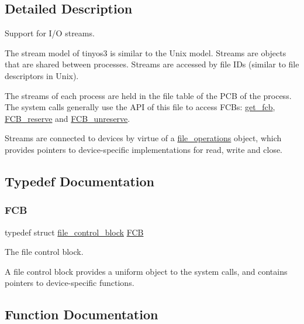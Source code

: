 \subsection{Detailed Description}
Support for I/O streams. 

The stream model of tinyos3 is similar to the Unix model. Streams are objects that are shared between processes. Streams are accessed by file I\+Ds (similar to file descriptors in Unix).

The streams of each process are held in the file table of the P\+CB of the process. The system calls generally use the A\+PI of this file to access F\+C\+Bs\+: \hyperlink{group__streams_ga36b4f172aba29ba2660d0aed0f10d60b}{get\+\_\+fcb}, \hyperlink{group__streams_ga462269376de145171b87b7bc3036e4f8}{F\+C\+B\+\_\+reserve} and \hyperlink{group__streams_gac44c094845a8d4e2e13f9df5b17274df}{F\+C\+B\+\_\+unreserve}.

Streams are connected to devices by virtue of a {\ttfamily \hyperlink{structfile__operations}{file\+\_\+operations}} object, which provides pointers to device-\/specific implementations for read, write and close. 

\subsection{Typedef Documentation}
\mbox{\label{group__streams_ga0c7e751afb9d6cadebf070961804d400}} 
\subsubsection{\texorpdfstring{F\+CB}{FCB}}
{\footnotesize\ttfamily typedef struct \hyperlink{structfile__control__block}{file\+\_\+control\+\_\+block}  \hyperlink{group__streams_ga0c7e751afb9d6cadebf070961804d400}{F\+CB}}



The file control block. 

A file control block provides a uniform object to the system calls, and contains pointers to device-\/specific functions. 

\subsection{Function Documentation}
\mbox{\label{group__streams_ga26586eafc28dd1f2ac5bc7402922aa36}} 
